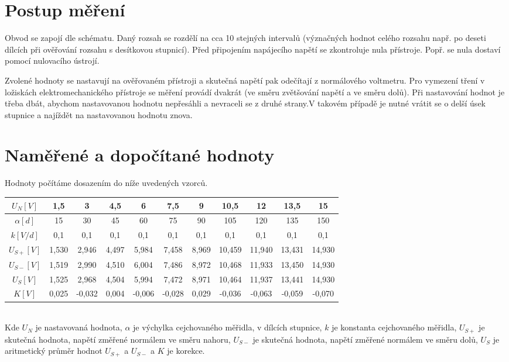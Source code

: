 \documentclass[12pt]{article} %
\begin{document}
\section{Postup měření}
Obvod se zapojí dle schématu. Daný rozsah se rozdělí na cca 10 stejných intervalů (význačných hodnot celého rozsahu např. po deseti dílcích při ověřování rozsahu s desítkovou stupnicí). Před připojením napájecího napětí se zkontroluje nula přístroje. Popř. se nula dostaví pomocí nulovacího ústrojí.

Zvolené hodnoty se nastavují na ověřovaném přístroji a skutečná napětí pak odečítají
z normálového voltmetru. Pro vymezení tření v ložiskách elektromechanického přístroje se
měření provádí dvakrát (ve směru zvětšování napětí a ve směru dolů). Při nastavování hodnot je třeba dbát, abychom nastavovanou hodnotu nepřesáhli a nevraceli se z druhé strany.V takovém případě je nutné vrátit se o delší úsek stupnice a najíždět na nastavovanou hodnotu znova.

\section{Naměřené a dopočítané hodnoty}
Hodnoty počítáme dosazením do níže uvedených vzorců.
\begin{tabular}{|c|c|c|c|c|c|c|c|c|c|c|}
\hline 
$U_N[V]$ & 1,5 & 3 & 4,5 & 6 & 7,5 & 9 & 10,5 & 12 & 13,5 & 15 \\ 
\hline 
$\alpha [d]$ & 15 & 30 & 45 & 60 & 75 & 90 & 105 & 120 & 135 & 150 \\ 
\hline 
$k[V/d]$ & 0,1 & 0,1 & 0,1 & 0,1 & 0,1 & 0,1 & 0,1 & 0,1 & 0,1 & 0,1 \\ 
\hline 
$U_{S+}[V]$ & 1,530 & 2,946 & 4,497 & 5,984 & 7,458 & 8,969 & 10,459 & 11,940 & 13,431 & 14,930 \\ 
\hline 
$U_{S-}[V]$ & 1,519 & 2,990 & 4,510 & 6,004 & 7,486 & 8,972 & 10,468 & 11,933 & 13,450 & 14,930 \\ 
\hline 
$U_S[V]$ & 1,525 & 2,968 & 4,504 & 5,994 & 7,472 & 8,971 & 10,464 & 11,937 & 13,441 & 14,930 \\ 
\hline 
$K[V]$ & 0,025 & -0,032 & 0,004 & -0,006 & -0,028 & 0,029 & -0,036 & -0,063 & -0,059 & -0,070 \\ 
\hline 
\end{tabular} 
\\[0.5cm]

Kde $U_N$ je nastavovaná hodnota, $\alpha$  je výchylka cejchovaného měřidla, v dílcích stupnice, $k$ je konstanta cejchovaného měřidla, $U_{S+}$ je skutečná hodnota, napětí změřené normálem ve směru nahoru, $U_{S-}$ je skutečná hodnota, napětí změřené normálem ve směru dolů, $U_S$ je aritmetický průměr hodnot $U_{S+}$ a $U_{S-}$ a $K$ je korekce.
\end{document}
